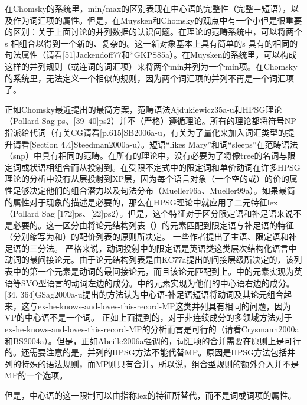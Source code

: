 在Chomsky的系统里，min/max的区别表现在中心语的完整性（完整＝短语），以及作为词汇项的属性。但是，在Muysken和Chomsky的观点中有一个小但是很重要的区别：关于上面讨论的并列数据的认识问题。在理论的范畴系统中，可以将两个s 相组合以得到一个新的、复杂的。这一新对象基本上具有简单的s 具有的相同的句法属性（请看[51]Jackendoff77和*GKPS85a）。在Muysken的系统里，可以构成这样的并列规则（或连词的词汇项）来将两个min并列为一个min项。在Chomsky的系统里，无法定义一个相似的规则，因为两个词汇项的并列不再是一个词汇项了。












正如Chomsky最近提出的最简方案，范畴语法Ajdukiewicz35a-u和HPSG理论（Pollard Sag ps、[39--40]ps2）并不（严格）遵循理论。所有的理论都将符号NP指派给代词（有关CG请看[p.615]SB2006a-u，有关为了量化来加入词汇类型的提升请看[Section 4.4]Steedman2000a-u）。短语“likes Mary”和词“sleeps”在范畴语法（snp）中具有相同的范畴。在所有的理论中，没有必要为了将像tree的名词与限定词或状语相组合而从投射到。在受限不定式中的限定词和单价动词在许多HPSG理论的分析中没有从层投射到XP层，因为每个语言对象（一个空的或）的价的属性足够决定他们的组合潜力以及句法分布（Mueller96a、Mueller99a）。如果最简的属性对于现象的描述是必要的，那么在HPSG理论中就应用了二元特征lex（Pollard Sag [172]ps、[22]ps2）。但是，这个特征对于区分限定语和补足语来说不是必要的。这一区分由将论元结构列表（）的元素匹配到限定语与补足语的特征（分别缩写为和）的配价列表的原则所决定。 
一些作者提出了主语、限定语和补足语的三分法。
 严格来说，动词投射中的限定语是英语类这类层次结构化语言中动词的最间接论元。由于论元结构列表是由KC77a提出的间接层级所决定的，该列表中的第一个元素是动词的最间接论元，而且该论元匹配到上。中的元素实现为英语等SVO型语言的动词左边的成分。中的元素实现为他们的中心语右边的成分。[34, 364]GSag2000a-u提出的方法认为中心语-补足语短语将动词及其论元组合起来，这与ex-he-knows-and-loves-this-record-MP这类并列具有相同的问题，因为VP的中心语不是一个词。 
正如上面提到的，对于非连续成分的多领域方法对于ex-he-knows-and-loves-this-record-MP的分析而言是可行的（请看Crysmann2000a和BS2004a）。但是，正如Abeille2006a强调的，词汇项的合并需要在原则上是可行的。还需要注意的是，并列的HPSG方法不能代替MP。原因是HPSG方法包括并列的特殊的语法规则，而MP则只有合并。所以说，组合型规则的额外介入并不是MP的一个选项。
 
但是，中心语的这一限制可以由指称lex的特征所替代，而不是词或词项的属性。







































